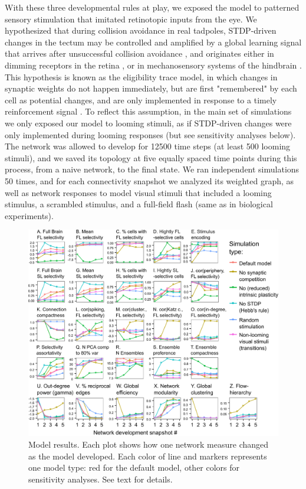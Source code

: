 \documentclass{article}
\begin{document}
With these three developmental rules at play, we exposed the model to patterned sensory stimulation that imitated retinotopic inputs from the eye. We hypothesized that during collision avoidance in real tadpoles, STDP-driven changes in the tectum may be controlled and amplified by a global learning signal that arrives after unsuccessful collision avoidance \citep{savin2014stdpreward,aswolinskiy2015stdpreward}, and originates either in dimming receptors in the retina \citep{baranauskas2012}, or in mechanosensory systems of the hindbrain \citep{pratt2009multisens,felch2016,truszkowski2017}. This hypothesis is known as the eligibility trace model, in which changes in synaptic weights do not happen immediately, but are first "remembered" by each cell as potential changes, and are only implemented in response to a timely reinforcement signal \citep{seung2003trace}. To reflect this assumption, in the main set of simulations we only exposed our model to looming stimuli, as if STDP-driven changes were only implemented during looming responses (but see sensitivity analyses below). The network was allowed to develop for 12500 time steps (at least 500 looming stimuli), and we saved its topology at five equally spaced time points during this process, from a naive network, to the final state. We ran independent simulations 50 times, and for each connectivity snapshot we analyzed its weighted graph, as well as network responses to model visual stimuli that included a looming stimulus, a scrambled stimulus, and a full-field flash (same as in biological experiments).

\begin{figure}
\includegraphics[width=\linewidth]{fig8.pdf}
\caption{
Model results. Each plot shows how one network measure changed as the model developed. Each color of line and markers represents one model type: red for the default model, other colors for sensitivity analyses. See text for details.}
\end{figure}
\end{document}
